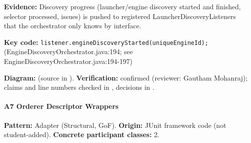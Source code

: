 \documentclass[11pt,a4paper]{article}
\begin{document}
\textbf{Evidence:} Discovery progress (launcher/engine discovery started and finished, selector processed, issues) is pushed to registered LauncherDiscoveryListeners that the orchestrator only knows by interface.\par
\textbf{Key code:} \texttt{listener.\allowbreak{}engine\allowbreak{}Discovery\allowbreak{}Started(unique\allowbreak{}Engine\allowbreak{}Id);} (EngineDiscoveryOrchestrator.java:194; see EngineDiscoveryOrchestrator.java:194-197)\par
\textbf{Diagram:}  (source in ). \textbf{Verification:} confirmed (reviewer: Gautham Mohanraj); claims and line numbers checked in , decisions in .\par
\paragraph{A7 Orderer Descriptor Wrappers} \textbf{Pattern:} Adapter (Structural, GoF). \textbf{Origin:} JUnit framework code (not student-added). \textbf{Concrete participant classes:} 2.\par
\end{document}
